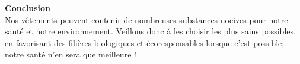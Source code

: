 \documentclass[8pt]{article}
\begin{document}
\textbf{Conclusion}\\


Nos vêtements peuvent contenir de nombreuses substances nocives pour notre santé et notre environnement. Veillons donc à les choisir les plus sains possibles, en favorisant des filières biologiques et écoresponsables lorsque c’est possible; notre santé n’en sera que meilleure !
\end{document}
